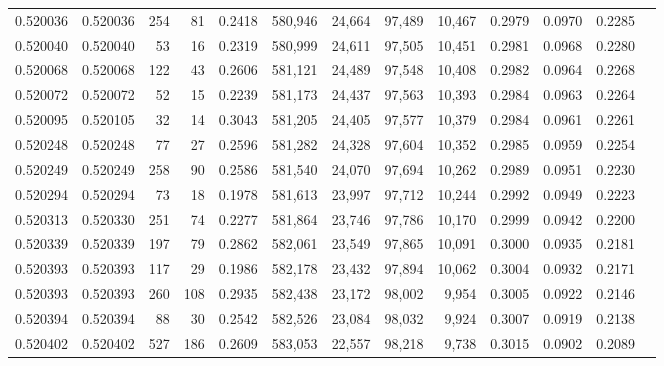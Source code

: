 \begin{tabular}{rrrrrrrrrrrrr}
0.520036 & 0.520036 &   254 &    81 &                                     0.2418 & 580,946 &  24,664 &  97,489 &  10,467 & 0.2979 & 0.0970 & 0.2285 \\
0.520040 & 0.520040 &    53 &    16 &                                     0.2319 & 580,999 &  24,611 &  97,505 &  10,451 & 0.2981 & 0.0968 & 0.2280 \\
0.520068 & 0.520068 &   122 &    43 &                                     0.2606 & 581,121 &  24,489 &  97,548 &  10,408 & 0.2982 & 0.0964 & 0.2268 \\
0.520072 & 0.520072 &    52 &    15 &                                     0.2239 & 581,173 &  24,437 &  97,563 &  10,393 & 0.2984 & 0.0963 & 0.2264 \\
0.520095 & 0.520105 &    32 &    14 &                                     0.3043 & 581,205 &  24,405 &  97,577 &  10,379 & 0.2984 & 0.0961 & 0.2261 \\
0.520248 & 0.520248 &    77 &    27 &                                     0.2596 & 581,282 &  24,328 &  97,604 &  10,352 & 0.2985 & 0.0959 & 0.2254 \\
0.520249 & 0.520249 &   258 &    90 &                                     0.2586 & 581,540 &  24,070 &  97,694 &  10,262 & 0.2989 & 0.0951 & 0.2230 \\
0.520294 & 0.520294 &    73 &    18 &                                     0.1978 & 581,613 &  23,997 &  97,712 &  10,244 & 0.2992 & 0.0949 & 0.2223 \\
0.520313 & 0.520330 &   251 &    74 &                                     0.2277 & 581,864 &  23,746 &  97,786 &  10,170 & 0.2999 & 0.0942 & 0.2200 \\
0.520339 & 0.520339 &   197 &    79 &                                     0.2862 & 582,061 &  23,549 &  97,865 &  10,091 & 0.3000 & 0.0935 & 0.2181 \\
0.520393 & 0.520393 &   117 &    29 &                                     0.1986 & 582,178 &  23,432 &  97,894 &  10,062 & 0.3004 & 0.0932 & 0.2171 \\
0.520393 & 0.520393 &   260 &   108 &                                     0.2935 & 582,438 &  23,172 &  98,002 &   9,954 & 0.3005 & 0.0922 & 0.2146 \\
0.520394 & 0.520394 &    88 &    30 &                                     0.2542 & 582,526 &  23,084 &  98,032 &   9,924 & 0.3007 & 0.0919 & 0.2138 \\
0.520402 & 0.520402 &   527 &   186 &                                     0.2609 & 583,053 &  22,557 &  98,218 &   9,738 & 0.3015 & 0.0902 & 0.2089 \\

\end{tabular}
